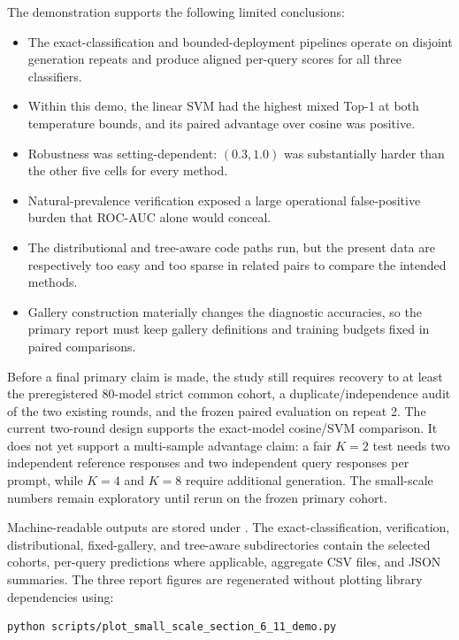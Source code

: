 \documentclass[11pt,a4paper]{article}
\begin{document}
The demonstration supports the following limited conclusions:

\begin{itemize}
  \item The exact-classification and bounded-deployment pipelines operate on
        disjoint generation repeats and produce aligned per-query scores for
        all three classifiers.
  \item Within this demo, the linear SVM had the highest mixed Top-1 at both
        temperature bounds, and its paired advantage over cosine was positive.
  \item Robustness was setting-dependent: $(0.3,1.0)$ was substantially harder
        than the other five cells for every method.
  \item Natural-prevalence verification exposed a large operational
        false-positive burden that ROC-AUC alone would conceal.
  \item The distributional and tree-aware code paths run, but the present data
        are respectively too easy and too sparse in related pairs to compare
        the intended methods.
  \item Gallery construction materially changes the diagnostic accuracies, so
        the primary report must keep gallery definitions and training budgets
        fixed in paired comparisons.
\end{itemize}

Before a final primary claim is made, the study still requires recovery to at
least the preregistered 80-model strict common cohort, a duplicate/independence
audit of the two existing rounds, and the frozen paired evaluation on repeat 2.
The current two-round design supports the exact-model cosine/SVM comparison.
It does not yet support a multi-sample advantage claim: a fair $K=2$ test needs
two independent reference responses and two independent query responses per
prompt, while $K=4$ and $K=8$ require additional generation. The small-scale
numbers remain exploratory until rerun on the frozen primary cohort.

Machine-readable outputs are stored under
. The exact-classification, verification,
distributional, fixed-gallery, and tree-aware subdirectories contain the
selected cohorts, per-query predictions where applicable, aggregate CSV files,
and JSON summaries. The three report figures are regenerated without plotting
library dependencies using:

\begin{lstlisting}[language=bash]
python scripts/plot_small_scale_section_6_11_demo.py
\end{lstlisting}
\end{document}
